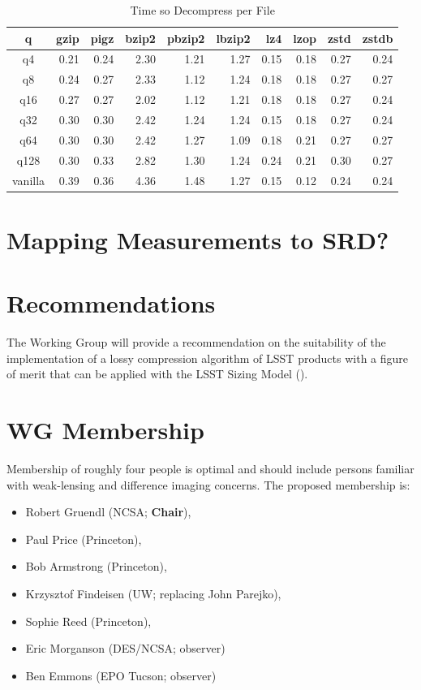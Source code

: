 \begin{table}
\caption{Time so Decompress per File}
\centering
\begin{tabular}[]{crrrrrrrrr}
\hline
 q        &  gzip & pigz & bzip2 & pbzip2 & lbzip2 & lz4 & lzop & zstd & zstdb  \\
\hline
 q4       &    0.21 &   0.24 &   2.30 &   1.21 &   1.27 &   0.15 &   0.18 &   0.27 &   0.24  \\
 q8       &    0.24 &   0.27 &   2.33 &   1.12 &   1.24 &   0.18 &   0.18 &   0.27 &   0.27  \\
 q16      &    0.27 &   0.27 &   2.02 &   1.12 &   1.21 &   0.18 &   0.18 &   0.27 &   0.24  \\
 q32      &    0.30 &   0.30 &   2.42 &   1.24 &   1.24 &   0.15 &   0.18 &   0.27 &   0.24  \\
 q64      &    0.30 &   0.30 &   2.42 &   1.27 &   1.09 &   0.18 &   0.21 &   0.27 &   0.27  \\
 q128     &    0.30 &   0.33 &   2.82 &   1.30 &   1.24 &   0.24 &   0.21 &   0.30 &   0.27  \\
 vanilla  &    0.39 &   0.36 &   4.36 &   1.48 &   1.27 &   0.15 &   0.12 &   0.24 &   0.24  \\
\hline
\end{tabular}
\label{timing_decompress}
\end{table}


\section{Mapping Measurements to SRD?}


\section{Recommendations}

The Working Group will provide a recommendation on the suitability of the implementation
of a lossy compression algorithm of LSST products with a figure of merit that can be 
applied with the LSST Sizing Model ().


\section{WG Membership}

Membership of roughly four people is optimal and should include persons familiar 
with weak-lensing and difference imaging concerns.
The proposed membership is:

\begin{itemize}
    \item Robert Gruendl (NCSA; \textbf{Chair}),
    \item Paul Price (Princeton),
    \item Bob Armstrong (Princeton),
    \item Krzysztof Findeisen (UW; replacing John Parejko),
    \item Sophie Reed (Princeton),
    \item Eric Morganson (DES/NCSA; observer)
    \item Ben Emmons (EPO Tucson; observer)
\end{itemize}


